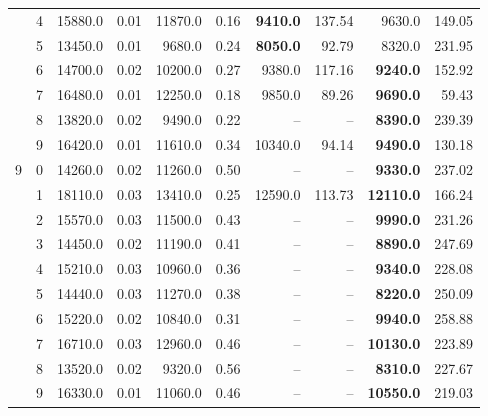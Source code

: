 {\begin{table}[htb!]
\begin{tabular}{cc|rr|rr|rr|rr}
 & 4 & 15880.0 & 0.01 & 11870.0 & 0.16 & \textbf{9410.0} & 137.54 & 9630.0 & 149.05 \\
 & 5 & 13450.0 & 0.01 & 9680.0 & 0.24 & \textbf{8050.0} & 92.79 & 8320.0 & 231.95 \\
 & 6 & 14700.0 & 0.02 & 10200.0 & 0.27 & 9380.0 & 117.16 & \textbf{9240.0} & 152.92 \\
 & 7 & 16480.0 & 0.01 & 12250.0 & 0.18 & 9850.0 & 89.26 & \textbf{9690.0} & 59.43 \\
 & 8 & 13820.0 & 0.02 & 9490.0 & 0.22 & -- & -- & \textbf{8390.0} & 239.39 \\
 & 9 & 16420.0 & 0.01 & 11610.0 & 0.34 & 10340.0 & 94.14 & \textbf{9490.0} & 130.18 \\ \hline
9 & 0 & 14260.0 & 0.02 & 11260.0 & 0.50 & -- & -- & \textbf{9330.0} & 237.02 \\
 & 1 & 18110.0 & 0.03 & 13410.0 & 0.25 & 12590.0 & 113.73 & \textbf{12110.0} & 166.24 \\
 & 2 & 15570.0 & 0.03 & 11500.0 & 0.43 & -- & -- & \textbf{9990.0} & 231.26 \\
 & 3 & 14450.0 & 0.02 & 11190.0 & 0.41 & -- & -- & \textbf{8890.0} & 247.69 \\
 & 4 & 15210.0 & 0.03 & 10960.0 & 0.36 & -- & -- & \textbf{9340.0} & 228.08 \\
 & 5 & 14440.0 & 0.03 & 11270.0 & 0.38 & -- & -- & \textbf{8220.0} & 250.09 \\
 & 6 & 15220.0 & 0.02 & 10840.0 & 0.31 & -- & -- & \textbf{9940.0} & 258.88 \\
 & 7 & 16710.0 & 0.03 & 12960.0 & 0.46 & -- & -- & \textbf{10130.0} & 223.89 \\
 & 8 & 13520.0 & 0.02 & 9320.0 & 0.56 & -- & -- & \textbf{8310.0} & 227.67 \\
 & 9 & 16330.0 & 0.01 & 11060.0 & 0.46 & -- & -- & \textbf{10550.0} & 219.03 \\
\bottomrule
\end{tabular}
\end{table}
}
